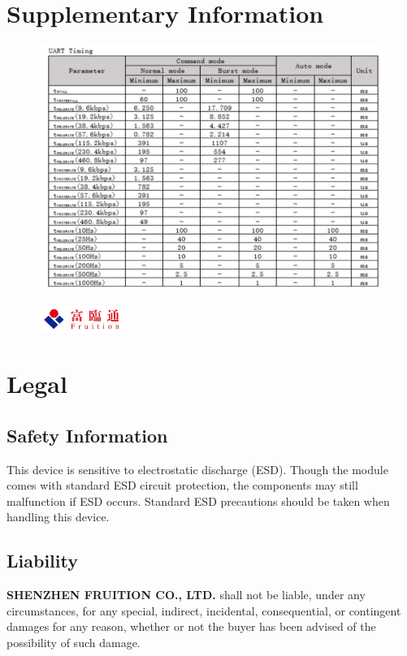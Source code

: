 \documentclass{scrreprt}
\newcommand{\pchapter}[1]{
	\begingroup\let\clearpage\relax
	\newpage
	\begin{figure}[H]
		\includegraphics[width=0.25\textwidth]{logo.jpeg}
	\end{figure}
	\chapter{#1}
	\endgroup
}
\begin{document}
\begin{CJK*}{UTF8}{gbsn}
\chapter{Supplementary Information}
\begin{figure}[H]
\centering\includegraphics[width=\textwidth]{uart_timing}
\end{figure}

\pchapter{Legal}
\section{Safety Information}
This device is sensitive to electrostatic discharge (ESD). Though the module
comes with standard ESD circuit protection, the components may still malfunction
if ESD occurs. Standard ESD precautions should be taken when handling this
device.

\section{Liability}
\textbf{SHENZHEN FRUITION CO., LTD.} shall not be liable, under any
circumstances, for any special, indirect, incidental, consequential, or
contingent damages for any reason, whether or not the buyer has been advised of
the possibility of such damage.

\end{CJK*}
\end{document}
